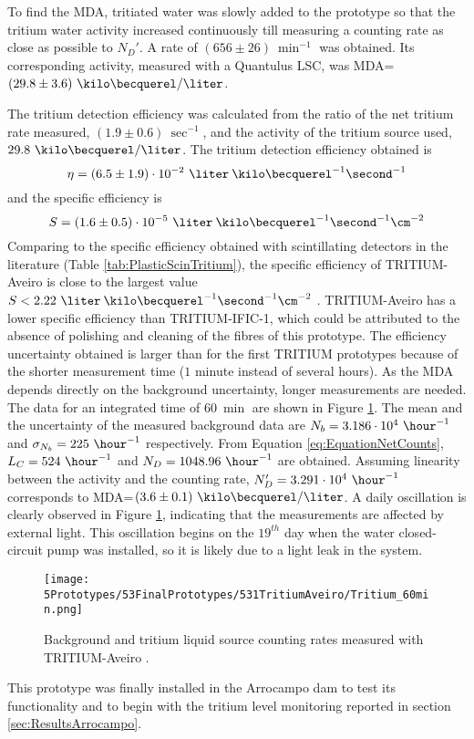 To find the MDA, tritiated water was slowly added to the prototype so that the tritium water activity increased continuously till measuring a counting rate as close as possible to $N_D'$. A rate of $(656 \pm 26)~\min^{-1}$ was obtained. Its corresponding activity, measured with a Quantulus LSC, was MDA=$(29.8\pm 3.6)~\kilo\becquerel/\liter$.

The tritium detection efficiency was calculated from the ratio of the net tritium rate measured, $(1.9 \pm 0.6)~\sec^{-1}$, and the activity of the tritium source used, $29.8~\kilo\becquerel/\liter$. The tritium detection efficiency obtained is $$\eta=(6.5 \pm 1.9)\cdot{} 10^{-2}~\liter\:\kilo\becquerel^{-1}\second^{-1}$$ and the specific efficiency is
$$S=(1.6 \pm 0.5)\cdot{} 10^{-5}~\liter\:\kilo\becquerel^{-1}\second^{-1}\cm^{-2}$$ 
Comparing to the specific efficiency obtained with scintillating detectors in the literature (Table \ref{tab:PlasticScinTritium}), the specific efficiency of TRITIUM-Aveiro is close to the largest value $S<2.22~\liter\:\kilo\becquerel^{-1}\second^{-1}\cm^{-2}$ \cite{Hofstetter1, Hofstetter2}. TRITIUM-Aveiro has a lower specific efficiency than TRITIUM-IFIC-1, which could be attributed to the absence of polishing and cleaning of the fibres of this prototype. The efficiency uncertainty obtained is larger than for the first TRITIUM prototypes because of the shorter measurement time ($1$ minute instead of several hours). As the MDA depends directly on the background uncertainty, longer measurements are needed. The data for an integrated time of $60~\min$ are shown in Figure \ref{fig:Tritium60min}. The mean and the uncertainty of the measured background data are $N_b = 3.186 \cdot{} 10^{4}~\hour^{-1}$ and $\sigma_{N_b} = 225~\hour^{-1}$ respectively. From Equation \ref{eq:EquationNetCounts}, $L_C=524~\hour^{-1}$ and $N_D=1048.96~\hour^{-1}$ are obtained. Assuming linearity between the activity and the counting rate, $N_D'=3.291\cdot{}10^4~\hour^{-1}$ corresponds to MDA=$(3.6 \pm 0.1)~\kilo\becquerel/\liter$. A daily oscillation is clearly observed in Figure \ref{fig:Tritium60min}, indicating that the measurements are affected by external light. This oscillation begins on the $19^{th}$ day when the water closed-circuit pump was installed, so it is likely due to a light leak in the system.
\begin{figure}[h]
\centering
\texttt{[image: 5Prototypes/53FinalPrototypes/531TritiumAveiro/Tritium\_60min.png]}
\caption{Background and tritium liquid source counting rates measured with TRITIUM-Aveiro \cite{ExperimentalPaperCarlos} \label{fig:Tritium60min}.}
\end{figure}
This prototype was finally installed in the Arrocampo dam to test its functionality and to begin with the tritium level monitoring reported in section \ref{sec:ResultsArrocampo}.